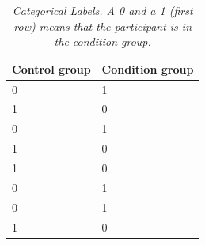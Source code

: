 \begin{table}
  \begin{center}
    \begin{tabular}{| l | l |}
      \hline
      \textbf{Control group} & \textbf{Condition group}  \\ \hline
      0                    &  1                \\ \hline
      1                    &  0                \\ \hline
      0                    &  1                \\ \hline
      1                    &  0                \\ \hline
      1                    &  0                \\ \hline
      0                    &  1                \\ \hline
      0                    &  1                \\ \hline
      1                    &  0                \\ \hline
    \end{tabular}
    \caption{\textit{Categorical Labels. A 0 and a 1 (first row) means that the participant is in the condition group.}}
    \label{table:categorical_labels}
  \end{center}
\end{table}

